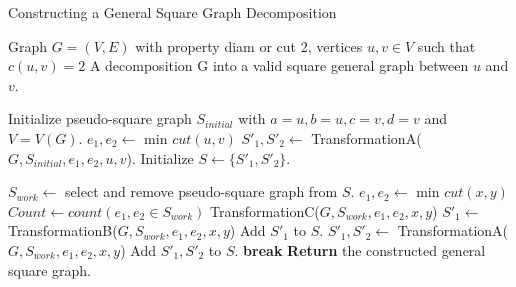 \documentclass [xcolor=svgnames, t] {beamer}
\begin{document}
\begin{frame}{Constructing a General Square Graph Decomposition}
\vspace{-1em} 
\begin{algorithm}[H]
\tiny
\label{alg:square_graph_revised}
\begin{algorithmic}[1]
\Require Graph \(G=(V,E)\) with property diam or cut 2, vertices \(u,v \in V\) such that \(c(u,v)=2\)
\Ensure A decomposition G into a valid square general graph between \(u\) and \(v\).

\State Initialize pseudo-square graph \(S_{initial}\) with \(a=u, b=u, c=v, d=v\) and \(V=V(G)\).
\State \(e_1, e_2 \leftarrow\) min \(cut(u, v)\)
\State \(S'_1, S'_2 \leftarrow\) TransformationA(\(G,S_{initial},e_1, e_2,u,v\)). 
\State Initialize \(S \leftarrow \{S'_1, S'_2\}\).

    \State \(S_{work} \leftarrow\) select and remove pseudo-square graph from \(S\).
         
            \State \(e_1, e_2 \leftarrow\) min \(cut(x, y)\) 
            \State \(Count \leftarrow count(e_1, e_2 \in S_{work})\)
                    \State TransformationC(\(G,S_{work},e_1, e_2,x,y\))
                \EndCase
                    \State \(S'_1 \leftarrow\) TransformationB(\(G,S_{work},e_1, e_2,x,y\))
                    \State Add \(S'_1\) to \(S\).
                \EndCase
                    \State \(S'_1, S'_2 \leftarrow\) TransformationA(\(G,S_{work},e_1, e_2,x,y\))
                    \State Add \(S'_1, S'_2\) to \(S\).
                \EndCase
            \EndSwitch
            \State \textbf{break}
        \EndIf 
    \EndFor
\EndWhile
\State \textbf{Return} the constructed general square graph.
\end{algorithmic}
\end{algorithm}
    
\end{frame}
\end{document}
